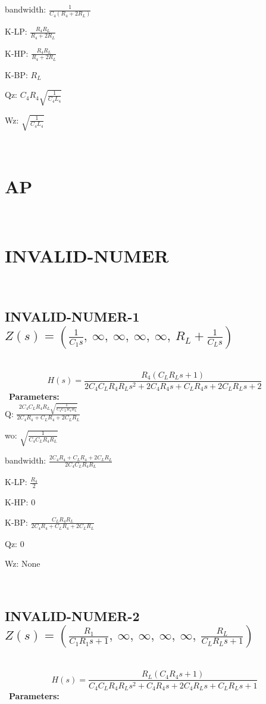 \documentclass{article}
\begin{document}
bandwidth: $\frac{1}{C_{4} \left(R_{4} + 2 R_{L}\right)}$\ 

K-LP: $\frac{R_{4} R_{L}}{R_{4} + 2 R_{L}}$\ 

K-HP: $\frac{R_{4} R_{L}}{R_{4} + 2 R_{L}}$\ 

K-BP: $R_{L}$\ 

Qz: $C_{4} R_{4} \sqrt{\frac{1}{C_{4} L_{4}}}$\ 

Wz: $\sqrt{\frac{1}{C_{4} L_{4}}}$\ 

\ 

\section{AP}\ 
\section{INVALID-NUMER}\ 
\subsection{INVALID-NUMER-1 $Z(s) = \left( \frac{1}{C_{1} s}, \  \infty, \  \infty, \  \infty, \  \infty, \  R_{L} + \frac{1}{C_{L} s}\right)$ } \ 
\textbf{\[H(s) = \frac{R_{4} \left(C_{L} R_{L} s + 1\right)}{2 C_{4} C_{L} R_{4} R_{L} s^{2} + 2 C_{4} R_{4} s + C_{L} R_{4} s + 2 C_{L} R_{L} s + 2}\] } \ 
\textbf{Parameters:}\\ 

Q: $\frac{2 C_{4} C_{L} R_{4} R_{L} \sqrt{\frac{1}{C_{4} C_{L} R_{4} R_{L}}}}{2 C_{4} R_{4} + C_{L} R_{4} + 2 C_{L} R_{L}}$\ 

wo: $\sqrt{\frac{1}{C_{4} C_{L} R_{4} R_{L}}}$\ 

bandwidth: $\frac{2 C_{4} R_{4} + C_{L} R_{4} + 2 C_{L} R_{L}}{2 C_{4} C_{L} R_{4} R_{L}}$\ 

K-LP: $\frac{R_{4}}{2}$\ 

K-HP: $0$\ 

K-BP: $\frac{C_{L} R_{4} R_{L}}{2 C_{4} R_{4} + C_{L} R_{4} + 2 C_{L} R_{L}}$\ 

Qz: $0$\ 

Wz: $\text{None}$\ 

\ 

\subsection{INVALID-NUMER-2 $Z(s) = \left( \frac{R_{1}}{C_{1} R_{1} s + 1}, \  \infty, \  \infty, \  \infty, \  \infty, \  \frac{R_{L}}{C_{L} R_{L} s + 1}\right)$ } \ 
\textbf{\[H(s) = \frac{R_{L} \left(C_{4} R_{4} s + 1\right)}{C_{4} C_{L} R_{4} R_{L} s^{2} + C_{4} R_{4} s + 2 C_{4} R_{L} s + C_{L} R_{L} s + 1}\] } \ 
\textbf{Parameters:}\\ 
\end{document}
